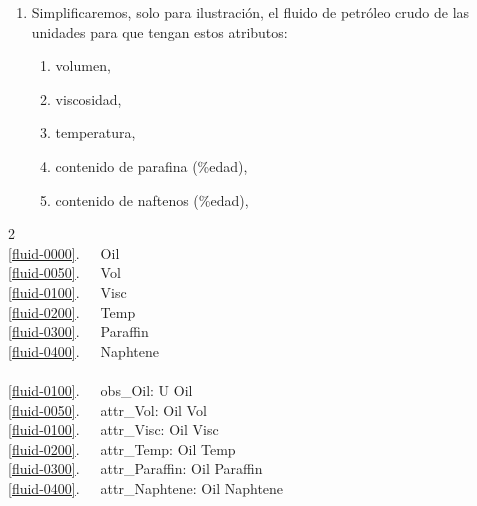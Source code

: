 \begin{enumerate}\setei
\item \label{fluid-0000} Simplificaremos, solo para ilustración, el fluido de petróleo crudo de
      las unidades para que tengan estos atributos:
\begin{enumerate}
\item \label{fluid-0050} volumen,
\item \label{fluid-0100} viscosidad,
\item \label{fluid-0200} temperatura, 
\item \label{fluid-0300} contenido de parafina (\%edad),
\item \label{fluid-0400} contenido de naftenos (\%edad),

\end{enumerate}
\savei\end{enumerate}
\begin{multicols}{2}
\bp
{}\\
\ref{fluid-0000}.\ \ \ Oil\\
\ref{fluid-0050}.\ \ \ Vol\\
\ref{fluid-0100}.\ \ \ Visc\ \ \ \\
\ref{fluid-0200}.\ \ \ Temp\\
\ref{fluid-0300}.\ \ \ Paraffin\\
\ref{fluid-0400}.\ \ \ Naphtene\\
\\
\ref{fluid-0100}.\ \ \ obs\_Oil: U {\RIGHTARROW} Oil\\
\ref{fluid-0050}.\ \ \ attr\_Vol: Oil {\RIGHTARROW} Vol\\
\ref{fluid-0100}.\ \ \ attr\_Visc: Oil {\RIGHTARROW} Visc\ \ \ \\
\ref{fluid-0200}.\ \ \ attr\_Temp: Oil {\RIGHTARROW} Temp\\
\ref{fluid-0300}.\ \ \ attr\_Paraffin: Oil {\RIGHTARROW} Paraffin\\
\ref{fluid-0400}.\ \ \ attr\_Naphtene: Oil {\RIGHTARROW} Naphtene\ \ 
\ep
\end{multicols} 

